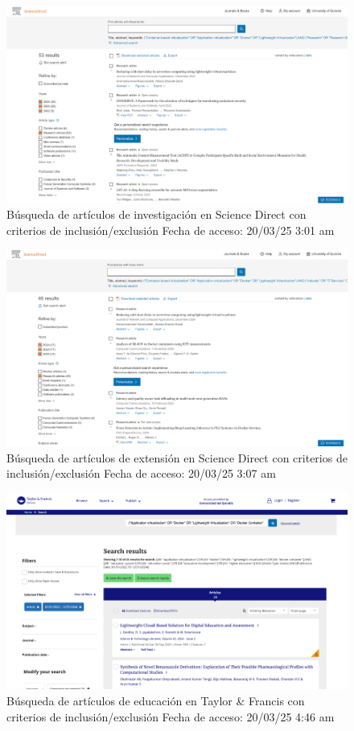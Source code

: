 \begin{figure}[htbp]
    \centering
    \includegraphics[width=\textwidth,keepaspectratio]{apendices/BD/criterios/SD-inv.png}
    \caption{Búsqueda de artículos de investigación en Science Direct con criterios de inclusión/exclusión
    Fecha de acceso: 20/03/25 3:01 am
    }\label{fig:busqueda26}
\end{figure}
\FloatBarrier
\begin{figure}[htbp]
    \centering
    \includegraphics[width=\textwidth,keepaspectratio]{apendices/BD/criterios/SD-ind.png}
    \caption{Búsqueda de artículos de extensión en Science Direct con criterios de inclusión/exclusión
    Fecha de acceso: 20/03/25 3:07 am
    }\label{fig:busqueda27}
\end{figure}
\FloatBarrier
\begin{figure}[htbp]
    \centering
    \includegraphics[width=\textwidth,keepaspectratio]{apendices/BD/criterios/TF-ed.png}
    \caption{Búsqueda de artículos de educación en Taylor \& Francis con criterios de inclusión/exclusión
    Fecha de acceso: 20/03/25 4:46 am
    }\label{fig:busqueda28}
\end{figure}
